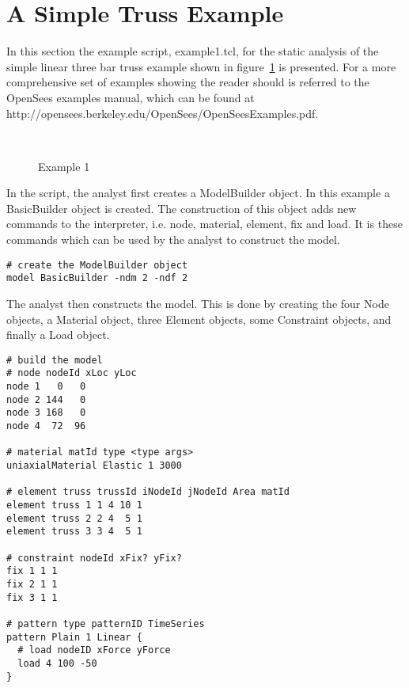 \documentclass[12pt]{article}
\begin{document}
\section{A Simple Truss Example}


\noindent In this section the example script, example1.tcl, for the
static analysis of the 
simple linear three bar truss example shown in figure~\ref{example1} is
presented. For a more comprehensive set of examples showing the reader
should is referred to the OpenSees examples manual, which can be found at
http://opensees.berkeley.edu/OpenSees/OpenSeesExamples.pdf.


\begin{figure}[htpb]
\begin{center}
\leavevmode
\hbox{%
}
\end{center}
\caption{Example 1}
\label{example1}
\end{figure}


In the script, the analyst first creates a ModelBuilder object. In
this example a BasicBuilder object is created. The construction of
this object adds new commands to the interpreter, i.e. node, material,
element, fix and load. It is these commands which can be used by the
analyst to construct the model.  

{\sf\small \begin{verbatim}
# create the ModelBuilder object
model BasicBuilder -ndm 2 -ndf 2
\end{verbatim} }

The analyst then constructs the model. This is done by creating
the four Node objects, a Material object, three Element objects, some
Constraint objects, and finally a Load object. 

{\sf\small \begin{verbatim}
# build the model 
# node nodeId xLoc yLoc
node 1   0   0 
node 2 144   0 
node 3 168   0
node 4  72  96

# material matId type <type args>
uniaxialMaterial Elastic 1 3000

# element truss trussId iNodeId jNodeId Area matId
element truss 1 1 4 10 1
element truss 2 2 4  5 1
element truss 3 3 4  5 1

# constraint nodeId xFix? yFix?
fix 1 1 1
fix 2 1 1
fix 3 1 1

# pattern type patternID TimeSeries
pattern Plain 1 Linear {
  # load nodeID xForce yForce
  load 4 100 -50
}

\end{verbatim} }
\end{document}
